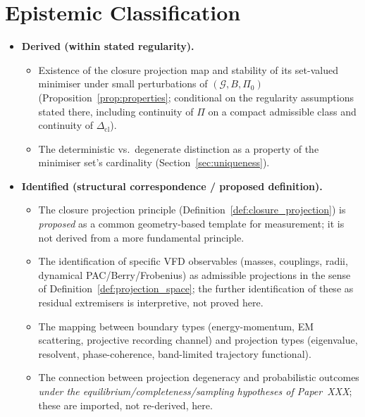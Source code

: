 \documentclass[12pt]{article}
\newcommand{\Gcal}{\mathcal{G}}
\newcommand{\Dcl}{\Delta_{\mathrm{cl}}}
\begin{document}
\section{Epistemic Classification}\label{sec:epistemic}

\begin{itemize}
    \item[$\blacktriangleright$] \textbf{Derived (within stated regularity).}
    \begin{itemize}
        \item Existence of the closure projection map and stability of its set-valued minimiser under small perturbations of $(\Gcal, B, \Pi_0)$ (Proposition~\ref{prop:properties}; conditional on the regularity assumptions stated there, including continuity of $\Pi$ on a compact admissible class and continuity of $\Dcl$).
        \item The deterministic vs.\ degenerate distinction as a property of the minimiser set's cardinality (Section~\ref{sec:uniqueness}).
    \end{itemize}

    \item[$\triangleright$] \textbf{Identified (structural correspondence / proposed definition).}
    \begin{itemize}
        \item The closure projection principle (Definition~\ref{def:closure_projection}) is \emph{proposed} as a common geometry-based template for measurement; it is not derived from a more fundamental principle.
        \item The identification of specific VFD observables (masses, couplings, radii, dynamical PAC/Berry/Frobenius) as admissible projections in the sense of Definition~\ref{def:projection_space}; the further identification of these as residual extremisers is interpretive, not proved here.
        \item The mapping between boundary types (energy-momentum, EM scattering, projective recording channel) and projection types (eigenvalue, resolvent, phase-coherence, band-limited trajectory functional).
        \item The connection between projection degeneracy and probabilistic outcomes \emph{under the equilibrium/completeness/sampling hypotheses of Paper~XXX}; these are imported, not re-derived, here.
    \end{itemize}


\end{itemize}
\end{document}
